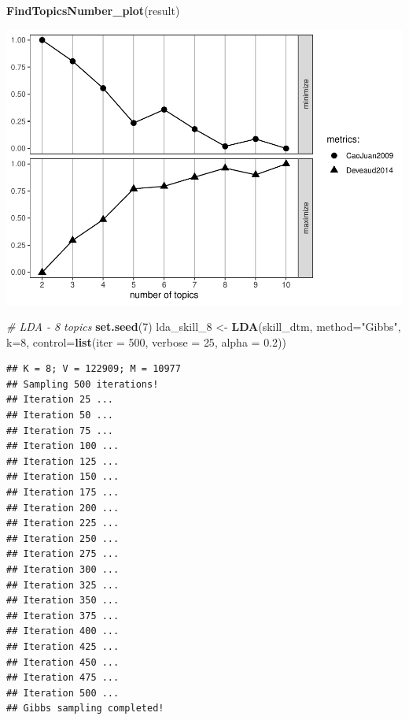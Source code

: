 \documentclass[11pt,]{article}
\newenvironment{Shaded}{\begin{snugshade}}{\end{snugshade}}
\newcommand{\AttributeTok}[1]{\textcolor[rgb]{0.13,0.29,0.53}{#1}}
\newcommand{\CommentTok}[1]{\textcolor[rgb]{0.56,0.35,0.01}{\textit{#1}}}
\newcommand{\DecValTok}[1]{\textcolor[rgb]{0.00,0.00,0.81}{#1}}
\newcommand{\FloatTok}[1]{\textcolor[rgb]{0.00,0.00,0.81}{#1}}
\newcommand{\FunctionTok}[1]{\textcolor[rgb]{0.13,0.29,0.53}{\textbf{#1}}}
\newcommand{\NormalTok}[1]{#1}
\newcommand{\OtherTok}[1]{\textcolor[rgb]{0.56,0.35,0.01}{#1}}
\newcommand{\StringTok}[1]{\textcolor[rgb]{0.31,0.60,0.02}{#1}}
\begin{document}
\begin{Shaded}
\begin{Highlighting}[]
\FunctionTok{FindTopicsNumber\_plot}\NormalTok{(result)}
\end{Highlighting}
\end{Shaded}

\includegraphics{figs/skill-tuning.pdf}

\begin{Shaded}
\begin{Highlighting}[]
\CommentTok{\# LDA {-} 8 topics}
\FunctionTok{set.seed}\NormalTok{(}\DecValTok{7}\NormalTok{)}
\NormalTok{lda\_skill\_8 }\OtherTok{\textless{}{-}} \FunctionTok{LDA}\NormalTok{(skill\_dtm, }\AttributeTok{method=}\StringTok{"Gibbs"}\NormalTok{, }\AttributeTok{k=}\DecValTok{8}\NormalTok{, }
                 \AttributeTok{control=}\FunctionTok{list}\NormalTok{(}\AttributeTok{iter =} \DecValTok{500}\NormalTok{, }\AttributeTok{verbose =} \DecValTok{25}\NormalTok{, }\AttributeTok{alpha =} \FloatTok{0.2}\NormalTok{))}
\end{Highlighting}
\end{Shaded}

\begin{verbatim}
## K = 8; V = 122909; M = 10977
## Sampling 500 iterations!
## Iteration 25 ...
## Iteration 50 ...
## Iteration 75 ...
## Iteration 100 ...
## Iteration 125 ...
## Iteration 150 ...
## Iteration 175 ...
## Iteration 200 ...
## Iteration 225 ...
## Iteration 250 ...
## Iteration 275 ...
## Iteration 300 ...
## Iteration 325 ...
## Iteration 350 ...
## Iteration 375 ...
## Iteration 400 ...
## Iteration 425 ...
## Iteration 450 ...
## Iteration 475 ...
## Iteration 500 ...
## Gibbs sampling completed!
\end{verbatim}
\end{document}
